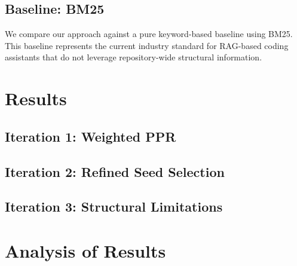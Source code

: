 \subsection{Baseline: BM25}
We compare our approach against a pure keyword-based baseline using BM25. This baseline represents the current industry standard for RAG-based coding assistants that do not leverage repository-wide structural information.

\section{Results}
\label{sec:results}

\subsection{Iteration 1: Weighted PPR}

\subsection{Iteration 2: Refined Seed Selection}

\subsection{Iteration 3: Structural Limitations}

\section{Analysis of Results}
\label{sec:analysis}
